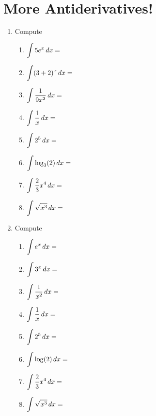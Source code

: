 \documentclass[10pt]{article}
\begin{document}
\newpage 

\section{More Antiderivatives!}
\begin{enumerate}
    \item Compute
    \begin{enumerate}
        \item $\displaystyle \int 5e^x \,dx=$
        \item $\displaystyle \int (3+2)^x \,dx=$ 
        \item $\displaystyle \int \frac{1}{9x^2} \,dx =$ 
        \item $\displaystyle \int \frac{1}{x} \,dx =$
        \item $\displaystyle \int 2^5 \,dx =$ 
        \item $\displaystyle \int \log_3(2) \,dx =$ 
        \item $\displaystyle \int \frac23x^4 \,dx =$
        \item $\displaystyle \int \sqrt{x^3} \,dx =$
            \end{enumerate}
        \item Compute
    \begin{enumerate}
        \item $\displaystyle \int e^x \,dx=$
        \item $\displaystyle \int 3^x \,dx=$ 
        \item $\displaystyle \int \frac{1}{x^2} \,dx =$ 
        \item $\displaystyle \int \frac{1}{x} \,dx =$
        \item $\displaystyle \int 2^5 \,dx =$ 
        \item $\displaystyle \int \log(2) \,dx =$ 
        \item $\displaystyle \int \frac23x^4 \,dx =$
        \item $\displaystyle \int \sqrt{x^3} \,dx =$
    \end{enumerate}
\end{enumerate}
\end{document}
